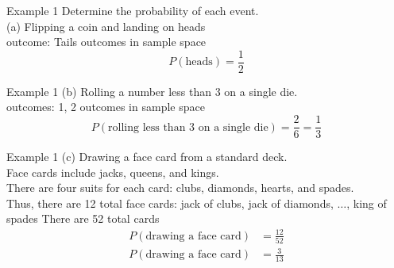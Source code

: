 \documentclass[t]{beamer}
\begin{document}
\begin{frame}{Example 1}
Determine the probability of each event.	\newline\\
(a)	\quad	Flipping a coin and landing on heads \newline\\	 outcome: Tails	\quad {} outcomes in sample space \pause
\[P(\text{heads}) = \frac{1}{2}\]
\end{frame}

\begin{frame}{Example 1}
(b)	\quad Rolling a number less than 3 on a single die.	\newline\\	 outcomes: 1, 2	\quad	{} outcomes in sample space \pause
\[P(\text{rolling less than 3 on a single die}) = \frac{2}{6} = \frac{1}{3} \]
\end{frame}

\begin{frame}{Example 1}
(c)	\quad	Drawing a face card from a standard deck.	\newline\\	\pause
Face cards include jacks, queens, and kings. \newline\\	\pause
There are four suits for each card: clubs, diamonds, hearts, and spades.	\newline\\	\pause
Thus, there are 12 total face cards: jack of clubs, jack of diamonds, $\dots$, king of spades	\quad \pause There are 52 total cards	\pause
\begin{align*}
P(\text{drawing a face card}) &= \frac{12}{52} \\[6pt]	
P(\text{drawing a face card}) &= \frac{3}{13}
\end{align*}
\end{frame}
\end{document}
